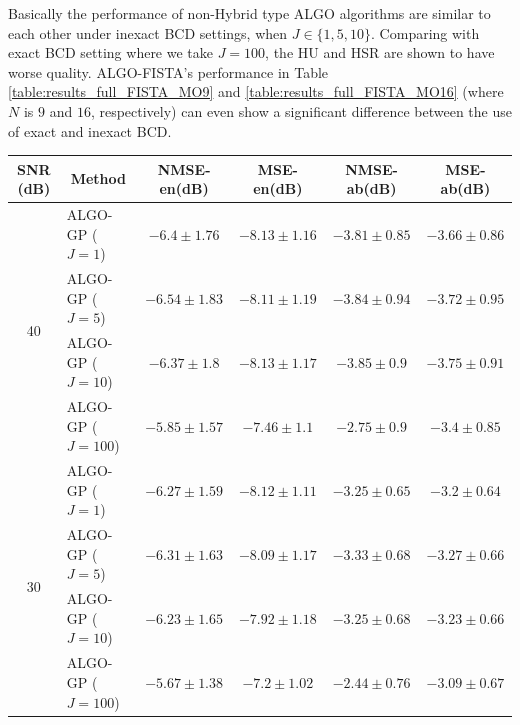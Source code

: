 Basically the performance of non-Hybrid type ALGO algorithms are similar to
each other under inexact BCD settings, \ie when $J\in\{1,5,10\}$.
Comparing with exact BCD setting where we take $J=100$, the HU and HSR are
shown to have worse quality.
ALGO-FISTA's performance in Table \ref{table:results_full_FISTA_MO9} and
\ref{table:results_full_FISTA_MO16} (where $N$ is $9$ and $16$, respectively)
can even show a significant difference between the use of exact and inexact BCD.

\begin{table}[h]
\centering
\begin{adjustbox}{max width=\textwidth}
\begin{tabular}{|c|l|c|c|c|c|}
\hline
SNR (dB)            & \multicolumn{1}{c|}{Method}& NMSE-en(dB)         & MSE-en(dB)          & NMSE-ab(dB)         & MSE-ab(dB)          \tabularnewline \hline
\multirow{4}{*}{40} & ALGO-GP ($J=1$)            & $-6.4     \pm 1.76$ & $-8.13    \pm 1.16$ & $-3.81    \pm 0.85$ & $-3.66    \pm 0.86$ \tabularnewline
                    & ALGO-GP ($J=5$)            & $-6.54    \pm 1.83$ & $-8.11    \pm 1.19$ & $-3.84    \pm 0.94$ & $-3.72    \pm 0.95$ \tabularnewline
                    & ALGO-GP ($J=10$)           & $-6.37    \pm 1.8$  & $-8.13    \pm 1.17$ & $-3.85    \pm 0.9$  & $-3.75    \pm 0.91$ \tabularnewline
                    & ALGO-GP ($J=100$)          & $-5.85    \pm 1.57$ & $-7.46    \pm 1.1$  & $-2.75    \pm 0.9$  & $-3.4     \pm 0.85$ \tabularnewline \hline
\multirow{4}{*}{30} & ALGO-GP ($J=1$)            & $-6.27    \pm 1.59$ & $-8.12    \pm 1.11$ & $-3.25    \pm 0.65$ & $-3.2     \pm 0.64$ \tabularnewline
                    & ALGO-GP ($J=5$)            & $-6.31    \pm 1.63$ & $-8.09    \pm 1.17$ & $-3.33    \pm 0.68$ & $-3.27    \pm 0.66$ \tabularnewline
                    & ALGO-GP ($J=10$)           & $-6.23    \pm 1.65$ & $-7.92    \pm 1.18$ & $-3.25    \pm 0.68$ & $-3.23    \pm 0.66$ \tabularnewline
                    & ALGO-GP ($J=100$)          & $-5.67    \pm 1.38$ & $-7.2     \pm 1.02$ & $-2.44    \pm 0.76$ & $-3.09    \pm 0.67$ \tabularnewline \hline

\end{tabular}
\end{adjustbox}
\end{table}
